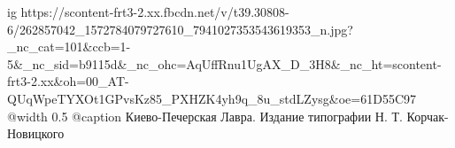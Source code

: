  
 
 
 
 

\ifcmt
  ig https://scontent-frt3-2.xx.fbcdn.net/v/t39.30808-6/262857042_1572784079727610_7941027353543619353_n.jpg?_nc_cat=101&ccb=1-5&_nc_sid=b9115d&_nc_ohc=AqUffRnu1UgAX_D_3H8&_nc_ht=scontent-frt3-2.xx&oh=00_AT-QUqWpeTYXOt1GPvsKz85_PXHZK4yh9q_8u_stdLZysg&oe=61D55C97
  @width 0.5
	@caption Киево-Печерская Лавра. Издание типографии Н. Т. Корчак-Новицкого
\fi
